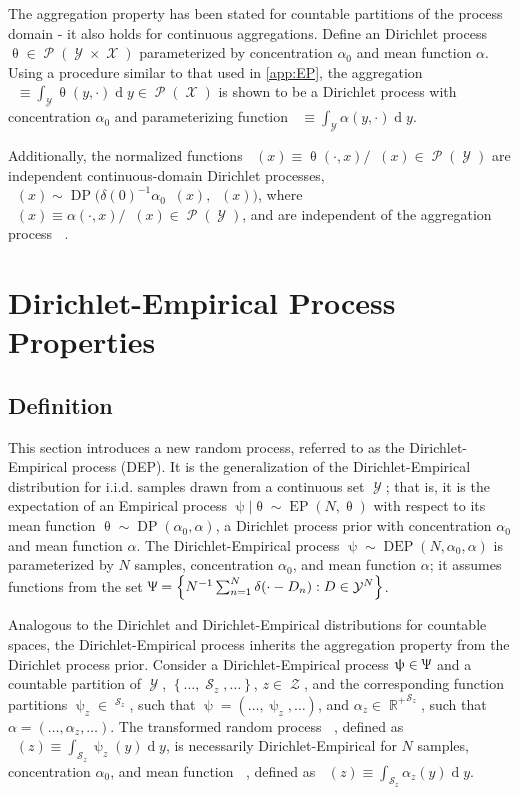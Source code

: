 \documentclass[12pt]{report}
\DeclareMathOperator{\drm}{\mathrm{d}}
\DeclareMathOperator{\Xcal}{\mathcal{X}}
\DeclareMathOperator{\Ycal}{\mathcal{Y}}
\DeclareMathOperator{\Zcal}{\mathcal{Z}}
\DeclareMathOperator{\Scal}{\mathcal{S}}
\DeclareMathOperator{\Pcal}{\mathcal{P}}
\DeclareMathOperator{\Rbb}{\mathbb{R}}
\DeclareMathOperator{\Rbbgeq}{\mathbb{R}_{\geq 0}}
\DeclareMathOperator{\DP}{\mathrm{DP}}
\DeclareMathOperator{\EP}{\mathrm{EP}}
\DeclareMathOperator{\DEP}{\mathrm{DEP}}
\DeclareMathOperator{\upthetam}{\uptheta_\text{m}}
\DeclareMathOperator{\upthetac}{\uptheta_\text{c}}
\DeclareMathOperator{\uppsim}{\uppsi_\text{m}}
\DeclareMathOperator{\alpham}{\alpha_\text{m}}
\DeclareMathOperator{\alphac}{\alpha_\text{c}}
\begin{document}
The aggregation property has been stated for countable partitions of the process domain - it also holds for continuous aggregations. Define an Dirichlet process $\uptheta \in \Pcal(\Ycal \times \Xcal)$ parameterized by concentration $\alpha_0$ and mean function $\alpha$. Using a procedure similar to that used in \ref{app:EP}, the aggregation $\upthetam \equiv \int_{\Ycal} \uptheta(y,\cdot) {\drm}y \in \Pcal(\Xcal)$ is shown to be a Dirichlet process with concentration $\alpha_0$ and parameterizing function $\alpham \equiv \int_{\Ycal} \alpha(y,\cdot) {\drm}y$. 

Additionally, the normalized functions $\upthetac(x) \equiv \uptheta(\cdot,x) / \upthetam(x) \in \Pcal(\Ycal)$ are independent continuous-domain Dirichlet processes, $\upthetac(x) \sim \DP\big(\delta(0) ^{-1} \alpha_0 \alpham(x), \alphac(x)\big)$, where $\alphac(x) \equiv \alpha(\cdot,x) / \alpham(x) \in \Pcal(\Ycal)$, and are independent of the aggregation process $\upthetam$.









\section{Dirichlet-Empirical Process Properties} \label{app:DEP}


\subsection{Definition}

This section introduces a new random process, referred to as the Dirichlet-Empirical process (DEP). It is the generalization of the Dirichlet-Empirical distribution for i.i.d. samples drawn from a continuous set $\Ycal$; that is, it is the expectation of an Empirical process $\uppsi | \uptheta \sim \EP(N,\uptheta)$ with respect to its mean function $\uptheta \sim \DP(\alpha_0,\alpha)$, a Dirichlet process prior with concentration $\alpha_0$ and mean function $\alpha$. The Dirichlet-Empirical process $\uppsi \sim \DEP(N,\alpha_0,\alpha)$ is parameterized by $N$ samples, concentration $\alpha_0$, and mean function $\alpha$; it assumes functions from the set $\Uppsi = \left\{ N^{-1} \sum_{n=1}^N \delta(\cdot - D_n) : D \in \Ycal^N \right\}$.

Analogous to the Dirichlet and Dirichlet-Empirical distributions for countable spaces, the Dirichlet-Empirical process inherits the aggregation property from the Dirichlet process prior. Consider a Dirichlet-Empirical process $\uppsi \in \Uppsi$ and a countable partition of $\Ycal$, $\left\{ \ldots,\Scal_z,\ldots \right\}$, $z \in \Zcal$, and the corresponding function partitions $\uppsi_z \in \Rbbgeq^{\Scal_z}$, such that $\uppsi = \left( \ldots,\uppsi_z,\ldots \right)$, and $\alpha_z \in {\Rbb^+}^{\Scal_z}$, such that $\alpha = \left( \ldots,\alpha_z,\ldots \right)$. The transformed random process $\uppsim$, defined as $\uppsim(z) \equiv \int_{\Scal_z} \uppsi_z(y) {\drm}y$, is necessarily Dirichlet-Empirical for $N$ samples, concentration $\alpha_0$, and mean function $\alpham$, defined as $\alpham(z) \equiv \int_{\Scal_z} \alpha_z(y) {\drm}y$.
\end{document}
